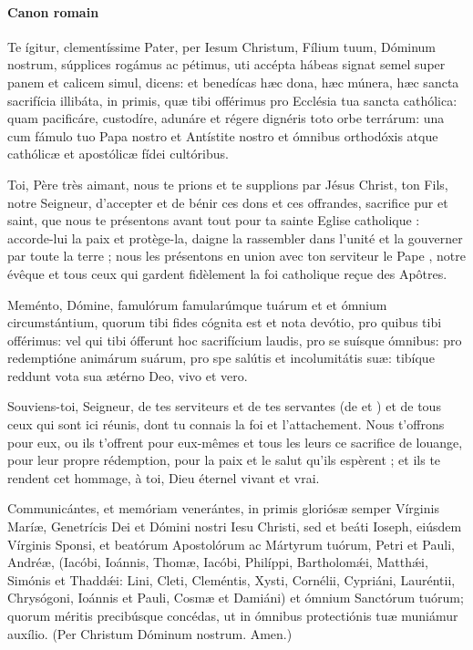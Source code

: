 \documentclass[twoside]{article}
\begin{document}
\paragraph{Canon romain}
\begin{paracol}{2}
Te ígitur, clementíssime Pater,
per Iesum Christum, Fílium tuum,
Dóminum nostrum,
súpplices rogámus ac pétimus,
uti accépta hábeas
signat semel super panem et calicem simul, dicens: 
et benedícas \cc hæc dona, hæc múnera,
hæc sancta sacrifícia illibáta,
in primis, quæ tibi offérimus
pro Ecclésia tua sancta cathólica:
quam pacificáre, custodíre, adunáre
et régere dignéris toto orbe terrárum:
una cum fámulo tuo Papa nostro 
et Antístite nostro 
et ómnibus orthodóxis atque cathólicæ
et apostólicæ fídei cultóribus.

\switchcolumn

Toi, Père très aimant, nous te prions et te supplions par Jésus Christ, ton Fils, notre Seigneur, d’accepter et de bénir \cc ces dons et ces offrandes, sacrifice pur et saint, que nous te présentons avant tout pour ta sainte Eglise catholique : accorde-lui la paix et protège-la, daigne la rassembler dans l'unité et la gouverner par toute la terre ; nous les présentons en union avec  ton serviteur le Pape , notre évêque  et tous ceux qui gardent fidèlement la foi catholique reçue des Apôtres.

\switchcolumn*

Meménto, Dómine,
famulórum famularúmque tuárum  et 
et ómnium circumstántium,
quorum tibi fides cógnita est et nota devótio,
pro quibus tibi offérimus:
vel qui tibi ófferunt hoc sacrifícium laudis,
pro se suísque ómnibus:
pro redemptióne animárum suárum,
pro spe salútis et incolumitátis suæ:
tibíque reddunt vota sua
ætérno Deo, vivo et vero.

\switchcolumn

Souviens-toi, Seigneur, de tes serviteurs et de tes servantes (de  et ) et de tous ceux qui sont ici réunis, dont tu connais la foi et l'attachement. Nous t'offrons pour eux, ou ils t'offrent pour eux-mêmes et tous les leurs ce sacrifice de louange, pour leur propre rédemption, pour la paix et le salut qu'ils espèrent ; et ils te rendent cet hommage, à toi, Dieu éternel vivant et vrai.

\switchcolumn*

Communicántes,
et memóriam venerántes,
in primis gloriósæ semper Vírginis Maríæ,
Genetrícis Dei et Dómini nostri Iesu Christi, 
sed et beáti Ioseph, eiúsdem Vírginis Sponsi,
et beatórum Apostolórum ac Mártyrum tuórum,
Petri et Pauli, Andréæ,
(Iacóbi, Ioánnis,
Thomæ, Iacóbi, Philíppi,
Bartholomǽi, Matthǽi,
Simónis et Thaddǽi: 
Lini, Cleti, Cleméntis, Xysti,
Cornélii, Cypriáni,
Lauréntii, Chrysógoni,
Ioánnis et Pauli,
Cosmæ et Damiáni)
et ómnium Sanctórum tuórum;
quorum méritis precibúsque concédas,
ut in ómnibus protectiónis tuæ muniámur auxílio.
(Per Christum Dóminum nostrum. Amen.)


\end{paracol}
\end{document}
